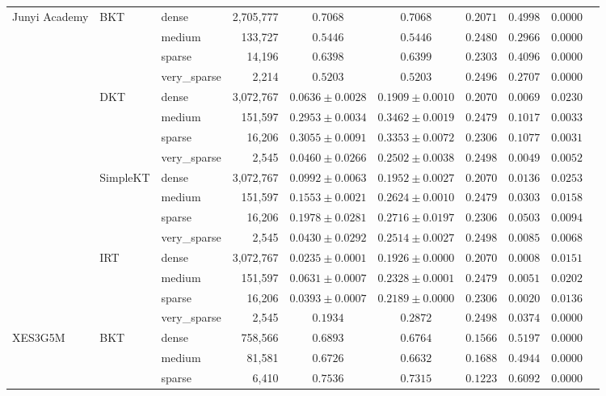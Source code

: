 \begin{table}[h]
\begin{tabular}{lllrcccccc}
\midrule
Junyi Academy & BKT & dense & 2,705,777 & $0.7068$ & $0.7068$ & $0.2071$ & $0.4998$ & $0.0000$ \\
 &  & medium & 133,727 & $0.5446$ & $0.5446$ & $0.2480$ & $0.2966$ & $0.0000$ \\
 &  & sparse & 14,196 & $0.6398$ & $0.6399$ & $0.2303$ & $0.4096$ & $0.0000$ \\
 &  & very\_sparse & 2,214 & $0.5203$ & $0.5203$ & $0.2496$ & $0.2707$ & $0.0000$ \\
 & DKT & dense & 3,072,767 & $0.0636 \pm 0.0028$ & $0.1909 \pm 0.0010$ & $0.2070$ & $0.0069$ & $0.0230$ \\
 &  & medium & 151,597 & $0.2953 \pm 0.0034$ & $0.3462 \pm 0.0019$ & $0.2479$ & $0.1017$ & $0.0033$ \\
 &  & sparse & 16,206 & $0.3055 \pm 0.0091$ & $0.3353 \pm 0.0072$ & $0.2306$ & $0.1077$ & $0.0031$ \\
 &  & very\_sparse & 2,545 & $0.0460 \pm 0.0266$ & $0.2502 \pm 0.0038$ & $0.2498$ & $0.0049$ & $0.0052$ \\
 & SimpleKT & dense & 3,072,767 & $0.0992 \pm 0.0063$ & $0.1952 \pm 0.0027$ & $0.2070$ & $0.0136$ & $0.0253$ \\
 &  & medium & 151,597 & $0.1553 \pm 0.0021$ & $0.2624 \pm 0.0010$ & $0.2479$ & $0.0303$ & $0.0158$ \\
 &  & sparse & 16,206 & $0.1978 \pm 0.0281$ & $0.2716 \pm 0.0197$ & $0.2306$ & $0.0503$ & $0.0094$ \\
 &  & very\_sparse & 2,545 & $0.0430 \pm 0.0292$ & $0.2514 \pm 0.0027$ & $0.2498$ & $0.0085$ & $0.0068$ \\
 & IRT & dense & 3,072,767 & $0.0235 \pm 0.0001$ & $0.1926 \pm 0.0000$ & $0.2070$ & $0.0008$ & $0.0151$ \\
 &  & medium & 151,597 & $0.0631 \pm 0.0007$ & $0.2328 \pm 0.0001$ & $0.2479$ & $0.0051$ & $0.0202$ \\
 &  & sparse & 16,206 & $0.0393 \pm 0.0007$ & $0.2189 \pm 0.0000$ & $0.2306$ & $0.0020$ & $0.0136$ \\
 &  & very\_sparse & 2,545 & $0.1934$ & $0.2872$ & $0.2498$ & $0.0374$ & $0.0000$ \\
\midrule
XES3G5M & BKT & dense & 758,566 & $0.6893$ & $0.6764$ & $0.1566$ & $0.5197$ & $0.0000$ \\
 &  & medium & 81,581 & $0.6726$ & $0.6632$ & $0.1688$ & $0.4944$ & $0.0000$ \\
 &  & sparse & 6,410 & $0.7536$ & $0.7315$ & $0.1223$ & $0.6092$ & $0.0000$ \\

\end{tabular}
\end{table}
